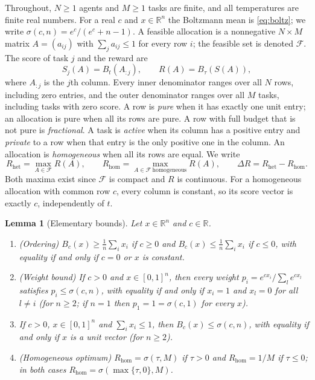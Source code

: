 \documentclass[11pt]{article}
\theoremstyle{plain}
\newtheorem{lemma}[theorem]{Lemma}
\theoremstyle{definition}
\theoremstyle{remark}
\newcommand{\R}{\mathbb{R}}
\newcommand{\Rhet}{R_{\mathrm{het}}}
\newcommand{\Rhom}{R_{\mathrm{hom}}}
\newcommand{\Feas}{\mathcal{F}}
\newcommand{\sig}{\sigma}
\begin{document}
Throughout, $N\ge1$ agents and $M\ge1$ tasks are finite, and all temperatures are finite real numbers. For a real $c$ and $x\in\R^n$ the Boltzmann mean is \eqref{eq:boltz}; we write $\sig(c,n)=e^c/(e^c+n-1)$. A feasible allocation is a nonnegative $N\times M$ matrix $A=(a_{ij})$ with $\sum_j a_{ij}\le 1$ for every row $i$; the feasible set is denoted $\Feas$. The score of task $j$ and the reward are
\begin{equation}\label{eq:model}
 S_j(A)=B_t(A_{:j}),\qquad R(A)=B_\tau(S(A)),
\end{equation}
where $A_{:j}$ is the $j$th column. Every inner denominator ranges over all $N$ rows, including zero entries, and the outer denominator ranges over all $M$ tasks, including tasks with zero score. A row is \emph{pure} when it has exactly one unit entry; an allocation is pure when all its rows are pure. A row with full budget that is not pure is \emph{fractional}. A task is \emph{active} when its column has a positive entry and \emph{private} to a row when that entry is the only positive one in the column. An allocation is \emph{homogeneous} when all its rows are equal. We write
\[
 \Rhet=\max_{A\in\Feas}R(A),\qquad \Rhom=\max_{A\in\Feas\ \text{homogeneous}}R(A),\qquad \Delta R=\Rhet-\Rhom .
\]
Both maxima exist since $\Feas$ is compact and $R$ is continuous. For a homogeneous allocation with common row $c$, every column is constant, so its score vector is exactly $c$, independently of $t$.

\begin{lemma}[Elementary bounds]\label{lem:elementary}
Let $x\in\R^n$ and $c\in\R$.
\begin{enumerate}[nosep,label=(\roman*)]
\item (Ordering) $B_c(x)\ge\frac1n\sum_i x_i$ if $c\ge0$ and $B_c(x)\le\frac1n\sum_ix_i$ if $c\le0$, with equality if and only if $c=0$ or $x$ is constant.
\item (Weight bound) If $c>0$ and $x\in[0,1]^n$, then every weight $p_i=e^{cx_i}/\sum_l e^{cx_l}$ satisfies $p_i\le\sig(c,n)$, with equality if and only if $x_i=1$ and $x_l=0$ for all $l\ne i$ (for $n\ge2$; if $n=1$ then $p_1=1=\sig(c,1)$ for every $x$).
\item If $c>0$, $x\in[0,1]^n$ and $\sum_ix_i\le1$, then $B_c(x)\le\sig(c,n)$, with equality if and only if $x$ is a unit vector (for $n\ge2$).
\item (Homogeneous optimum) $\Rhom=\sig(\tau,M)$ if $\tau>0$ and $\Rhom=1/M$ if $\tau\le0$; in both cases $\Rhom=\sig(\max\{\tau,0\},M)$.
\end{enumerate}
\end{lemma}
\end{document}
